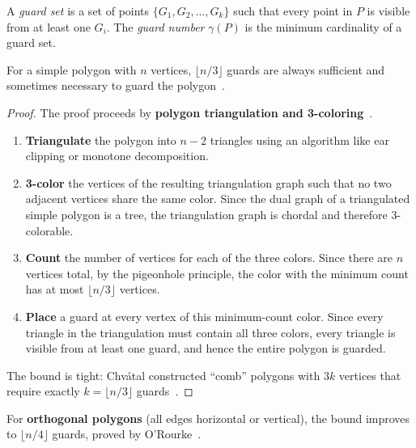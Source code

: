 \begin{definition}
\label{def:ag_guard_set}
A \emph{guard set} is a set of points $\{G_1, G_2, \dots, G_k\}$ such that every point in $P$ is visible from at least one $G_i$. The \emph{guard number} $\gamma(P)$ is the minimum cardinality of a guard set.
\end{definition}

\begin{theorem}
\label{thm:chvatal}
For a simple polygon with $n$ vertices, $\lfloor n/3 \rfloor$ guards are always sufficient and sometimes necessary to guard the polygon~\cite{chvatal1975}.
\end{theorem}
\begin{proof}
The proof proceeds by \textbf{polygon triangulation and 3-coloring}~\cite{fisk1978}.
\begin{enumerate}
    \item \textbf{Triangulate} the polygon into $n-2$ triangles using an algorithm like ear clipping or monotone decomposition.
    \item \textbf{3-color} the vertices of the resulting triangulation graph such that no two adjacent vertices share the same color. Since the dual graph of a triangulated simple polygon is a tree, the triangulation graph is chordal and therefore 3-colorable.
    \item \textbf{Count} the number of vertices for each of the three colors. Since there are $n$ vertices total, by the pigeonhole principle, the color with the minimum count has at most $\lfloor n/3 \rfloor$ vertices.
    \item \textbf{Place} a guard at every vertex of this minimum-count color. Since every triangle in the triangulation must contain all three colors, every triangle is visible from at least one guard, and hence the entire polygon is guarded.
\end{enumerate}
The bound is tight: Chv\'{a}tal constructed ``comb'' polygons with $3k$ vertices that require exactly $k = \lfloor n/3 \rfloor$ guards~\cite{chvatal1975}.
\end{proof}

\begin{remark}
For \textbf{orthogonal polygons} (all edges horizontal or vertical), the bound improves to $\lfloor n/4 \rfloor$ guards, proved by O'Rourke~\cite{orourke1987}.
\end{remark}

